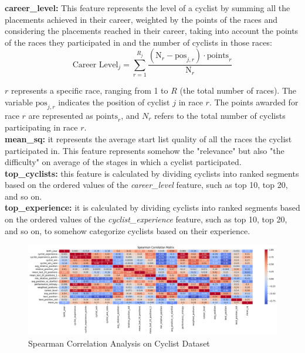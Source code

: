 \noindent
\textbf{career\_level:} 
This feature represents the level of a cyclist by summing all the placements achieved in their career, weighted by the points of the races and considering the placements reached in their career, taking into account the points of the races they participated in and the number of cyclists in those races:
\[
\text{Career Level}_j = \sum_{r=1}^{R_j} \frac{(\text{N}_r - \text{pos}_{j,r}) \cdot \text{points}_r}{\text{N}_r}
\]

\noindent
\( r \) represents a specific race, ranging from 1 to \( R \) (the total number of races). The variable \(\text{pos}_{j,r}\) indicates the position of cyclist \( j \) in race \( r \). The points awarded for race \( r \) are represented as \(\text{points}_r\), and \( N_r \) refers to the total number of cyclists participating in race \( r \).\\

\noindent
\textbf{mean\_sq:} it represents the average start list quality of all the races the cyclist participated in. This feature represents somehow the "relevance" but also "the difficulty" on average of the stages in which a cyclist participated. \\

\noindent
\textbf{top\_cyclists:} this feature is calculated by dividing cyclists into ranked segments based on the ordered values of the \textit{career\_level} feature, such as top 10, top 20, and so on.\\

\noindent
\textbf{top\_experience:} it is calculated by dividing cyclists into ranked segments based on the ordered values of the \textit{cyclist\_experience} feature, such as top 10, top 20, and so on, to somehow categorize cyclists based on their experience. \\


\begin{figure}[H]
\centering
\includegraphics[width=1\textwidth]{images/DE/correlation.png}
\caption{\small Spearman Correlation Analysis on Cyclist Dataset}
\label{fig:cyclists_feature_correlation}
\end{figure}

